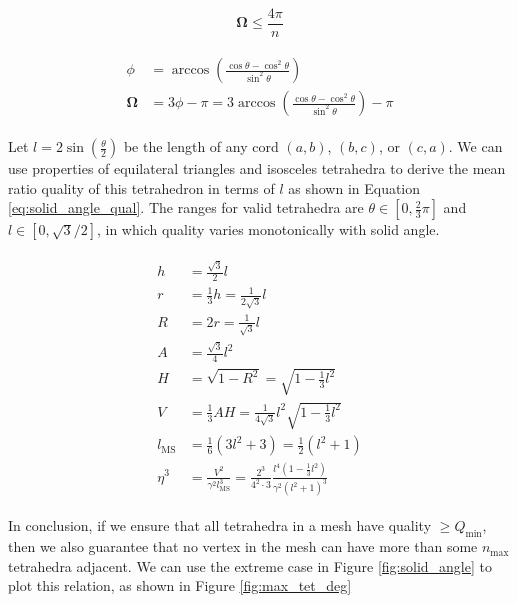 \begin{equation} \label{eq:solid_angle_degree}
\mathbf{\Omega} \leq \frac{4\pi}{n}
\end{equation}

\begin{gather} \label{eq:solid2side}
\begin{split}
\phi &= \arccos\left(\frac{\cos\theta - \cos^2\theta}{\sin^2\theta}\right) \\
\mathbf{\Omega} &= 3\phi - \pi = 3\arccos\left(\frac{\cos\theta - \cos^2\theta}{\sin^2\theta}\right) - \pi
\end{split}
\end{gather}

Let $l=2\sin\left(\frac{\theta}{2}\right)$ be the length of any cord $(a,b)$, $(b,c)$, or $(c,a)$.
We can use properties of equilateral triangles and isosceles
tetrahedra to derive the mean ratio quality of this tetrahedron
in terms of $l$ as shown in Equation \ref{eq:solid_angle_qual}.
The ranges for valid tetrahedra are $\theta\in[0,\frac23\pi]$ and $l\in[0,\sqrt{3}/2]$,
in which quality varies monotonically with solid angle.

\begin{gather} \label{eq:solid_angle_qual}
\begin{split}
h &= \tfrac{\sqrt{3}}{2}l \\
r &= \tfrac13 h = \tfrac{1}{2\sqrt{3}}l \\
R &= 2r = \tfrac{1}{\sqrt{3}}l \\
A &= \tfrac{\sqrt{3}}{4}l^2 \\
H &= \sqrt{1-R^2} = \sqrt{1-\tfrac13 l^2} \\
V &= \tfrac13 A H = \tfrac{1}{4\sqrt{3}} l^2\sqrt{1-\tfrac13 l^2} \\
l_{\text{MS}} &= \tfrac16(3l^2 + 3) = \tfrac12(l^2 + 1) \\
\eta^3 &= \frac{V^2}{\gamma^2 l_{\text{MS}}^3} =
\frac{2^3}{4^2\cdot 3}\frac{l^4(1-\tfrac13 l^2)}{\gamma^2 (l^2 + 1)^3}
\end{split}
\end{gather}

In conclusion, if we ensure that all tetrahedra in a mesh have
quality $\geq Q_{\text{min}}$, then we also guarantee that no
vertex in the mesh can have more than some $n_{\text{max}}$
tetrahedra adjacent.
We can use the extreme case in Figure \ref{fig:solid_angle}
to plot this relation, as shown in Figure \ref{fig:max_tet_deg}

